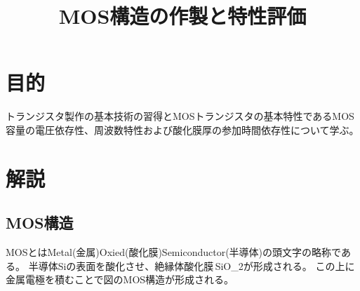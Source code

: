 \documentclass[11pt]{jarticle}
\title{MOS構造の作製と特性評価}
\begin{document}
\maketitle

\section{目的}
	トランジスタ製作の基本技術の習得とMOSトランジスタの基本特性であるMOS容量の電圧依存性、周波数特性および酸化膜厚の参加時間依存性について学ぶ。

\section{解説}
	\subsection{MOS構造}
		MOSとはMetal(金属)\-Oxied(酸化膜)\-Semiconductor(半導体)の頭文字の略称である。
		半導体Siの表面を酸化させ、絶縁体酸化膜\,SiO_{2}が形成される。
		この上に金属電極を積むことで図のMOS構造が形成される。
\end{document}
